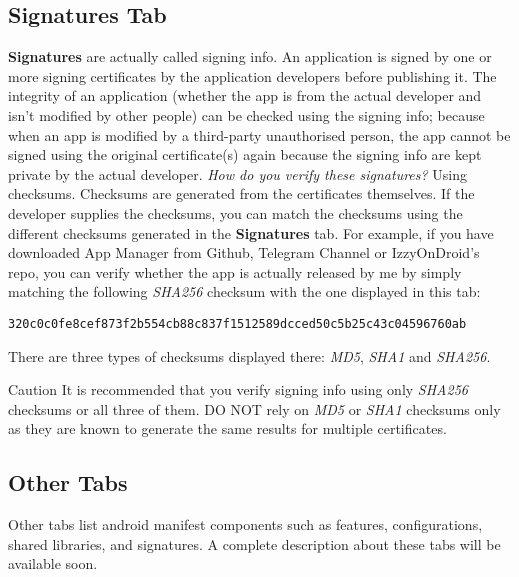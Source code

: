 \subsection{Signatures Tab}\label{subsec:signatures-tab} %
\textbf{Signatures} are actually called signing info. An application is signed by one or more signing certificates by
the application developers before publishing it. The integrity of an application (whether the app is from the actual
developer and isn't modified by other people) can be checked using the signing info; because when an app is modified by
a third-party unauthorised person, the app cannot be signed using the original certificate(s) again because the signing
info are kept private by the actual developer. \textit{How do you verify these signatures?} Using checksums. Checksums
are generated from the certificates themselves. If the developer supplies the checksums, you can match the checksums
using the different checksums generated in the \textbf{Signatures} tab. For example, if you have downloaded App Manager
from Github, Telegram Channel or IzzyOnDroid's repo, you can verify whether the app is actually released by me by simply
matching the following \textit{SHA256} checksum with the one displayed in this tab:
\begin{Verbatim}
320c0c0fe8cef873f2b554cb88c837f1512589dcced50c5b25c43c04596760ab
\end{Verbatim}

There are three types of checksums displayed there: \textit{MD5}, \textit{SHA1} and \textit{SHA256}.

\begin{danger}{Caution}
    It is recommended that you verify signing info using only \textit{SHA256} checksums or all three of them. DO NOT
    rely on \textit{MD5} or \textit{SHA1} checksums only as they are known to generate the same results for multiple
    certificates.
\end{danger}

\subsection{Other Tabs}\label{subsec:other-tabs} %
Other tabs list android manifest components such as features, configurations, shared libraries, and signatures. A
complete description about these tabs will be available soon.
